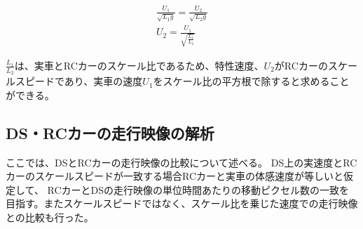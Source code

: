 \begin{align}
  \frac{U_1}{\sqrt{L_1g}} = \frac{U_2}{\sqrt{L_2g}} \label{taikan:eq:frude2}\\
  U_2 = \frac{U_1}{\sqrt{\frac{L_1}{L_2}}} \label{taikan:eq:frude3}
\end{align}

$\frac{L_1}{L_2}$は、実車とRCカーのスケール比であるため、特性速度、$U_2$がRCカーのスケールスピードであり、実車の速度$U_1$をスケール比の平方根で除すると求めることができる。

\subsection{DS・RCカーの走行映像の解析}
ここでは、DSとRCカーの走行映像の比較について述べる。
DS上の実速度とRCカーのスケールスピードが一致する場合RCカーと実車の体感速度が等しいと仮定して、
RCカーとDSの走行映像の単位時間あたりの移動ピクセル数の一致を目指す。またスケールスピードではなく、スケール比を乗じた速度での走行映像との比較も行った。

